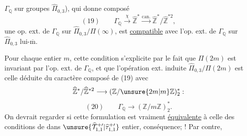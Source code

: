 $\Gamma_{\mathbb Q}$ sur  groupes  $\widehat\Pi_{0,3}$), qui donne  composé
\[
(19)\qquad \Gamma_{\mathbb Q}\xrightarrow{\chi}\widehat{\mathbb Z}^{*}\xrightarrow{\mathrm{can.}}\widehat{\mathbb Z}^{*}/\widehat{\mathbb Z}^{*2},
\]
 une op. ext. de $\Gamma_{\mathbb Q}$ sur $\widehat\Pi_{0,3}/\Pi(\infty)$, est \uline{compatible} avec l'op. ext. de $\Gamma_{\mathbb Q}$ sur $\widehat\Pi_{0,3}$ lui-$\overline{\mathrm m}$.

Pour chaque entier $m$, cette condition s'explicite par le fait que $\Pi(2m)$ est invariant par l'op. ext. de $\Gamma_{\mathbb Q}$, et que l'opération ext. induite  $\widehat\Pi_{0,3}/\Pi(2m)$ est celle déduite du caractère composé de (19) avec
\[
\widehat{\mathbb Z}^{*}/\widehat{\mathbb Z}^{*2}\longrightarrow(\mathbb Z/\unsure{2m|m}\mathbb Z)^*_2:
\]
\[
(20)\qquad \Gamma_{\mathbb Q}\longrightarrow(\mathbb Z/m\mathbb Z)^*_2.
\]
On devrait regarder si cette formulation est vraiment \uline{équivalente} à celle des conditions de  dans $\unsure{\widehat{\mathcal T}_{1,1}^{+\prime}|\widehat\tau_{1,1}^{+\prime}}$  entier,   conséquence;  ! Par contre, 
